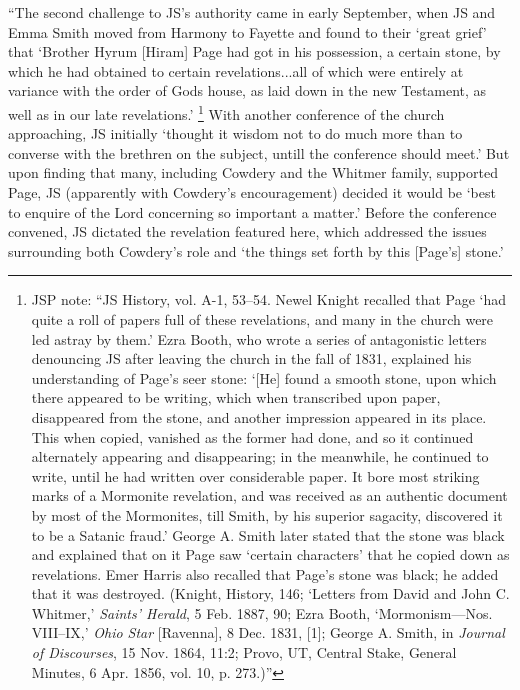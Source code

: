 			``The second challenge to JS's authority came in early September, when JS and Emma Smith moved from Harmony to Fayette and found to their `great grief' that `Brother Hyrum [Hiram] Page had got in his possession, a certain stone, by which he had obtained to certain revelations...all of which were entirely at variance with the order of Gods house, as laid down in the new Testament, as well as in our late revelations.'%
				\footnote{%
					JSP note: ``JS History, vol. A-1, 53--54. Newel Knight recalled that Page `had quite a roll of papers full of these revelations, and many in the church were led astray by them.' Ezra Booth, who wrote a series of antagonistic letters denouncing JS after leaving the church in the fall of 1831, explained his understanding of Page's seer stone: `[He] found a smooth stone, upon which there appeared to be writing, which when transcribed upon paper, disappeared from the stone, and another impression appeared in its place. This when copied, vanished as the former had done, and so it continued alternately appearing and disappearing; in the meanwhile, he continued to write, until he had written over considerable paper. It bore most striking marks of a Mormonite revelation, and was received as an authentic document by most of the Mormonites, till Smith, by his superior sagacity, discovered it to be a Satanic fraud.' George A. Smith later stated that the stone was black and explained that on it Page saw `certain characters' that he copied down as revelations. Emer Harris also recalled that Page's stone was black; he added that it was destroyed. (Knight, History, 146; `Letters from David and John C. Whitmer,' \textit{Saints' Herald}, 5 Feb. 1887, 90; Ezra Booth, `Mormonism---Nos. VIII--IX,' \textit{Ohio Star} [Ravenna], 8 Dec. 1831, [1]; George A. Smith, in \textit{Journal of Discourses}, 15 Nov. 1864, 11:2; Provo, UT, Central Stake, General Minutes, 6 Apr. 1856, vol. 10, p. 273.)''
					}
			With another conference of the church approaching, JS initially `thought it wisdom not to do much more than to converse with the brethren on the subject, untill the conference should meet.' But upon finding that many, including Cowdery and the Whitmer family, supported Page, JS (apparently with Cowdery's encouragement) decided it would be `best to enquire of the Lord concerning so important a matter.' Before the conference convened, JS dictated the revelation featured here, which addressed the issues surrounding both Cowdery's role and `the things set forth by this [Page's] stone.'
			
